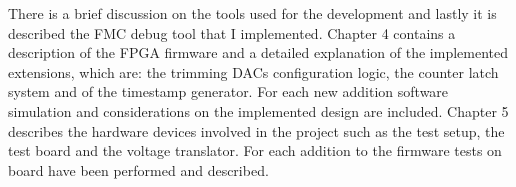 There is a brief discussion on the tools used for the development and lastly it is described the FMC debug tool that I implemented.
\vspace{0.25cm}
\newline
Chapter 4 contains a description of the FPGA firmware and a detailed explanation of the implemented extensions, which are: the trimming DACs configuration logic, the counter latch system and of the timestamp generator.
For each new addition software simulation and considerations on the implemented design are included.
\vspace{0.25cm}
\newline
Chapter 5 describes the hardware devices involved in the project such as the test setup, the test board and the voltage translator.
For each addition to the firmware tests on board have been performed and described.
